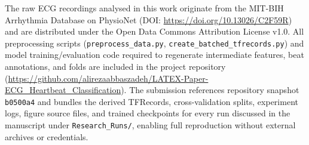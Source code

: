 The raw ECG recordings analysed in this work originate from the MIT-BIH Arrhythmia Database on PhysioNet (DOI: \url{https://doi.org/10.13026/C2F59R}) and are distributed under the Open Data Commons Attribution License v1.0. All preprocessing scripts (\texttt{preprocess\_data.py}, \texttt{create\_batched\_tfrecords.py}) and model training/evaluation code required to regenerate intermediate features, beat annotations, and folds are included in the project repository (\url{https://github.com/alirezaabbaszadeh/LATEX-Paper-ECG\_Heartbeat\_Classification}). The submission references repository snapshot \texttt{b0500a4} and bundles the derived TFRecords, cross-validation splits, experiment logs, figure source files, and trained checkpoints for every run discussed in the manuscript under \texttt{Research\_Runs/}, enabling full reproduction without external archives or credentials.
